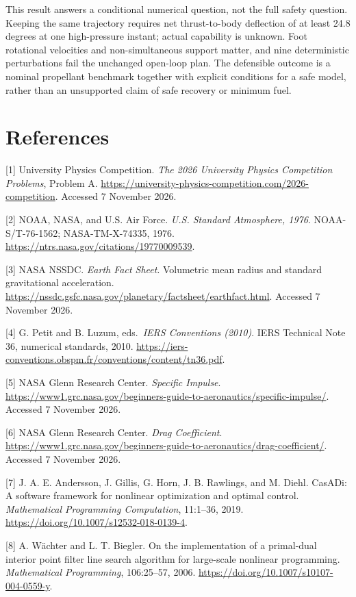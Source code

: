 \documentclass[
  11pt,
  a4paper,
]{article}
\begin{document}
This result answers a conditional numerical question, not the full
safety question. Keeping the same trajectory requires net thrust-to-body
deflection of at least 24.8 degrees at one high-pressure instant; actual
capability is unknown. Foot rotational velocities and non-simultaneous
support matter, and nine deterministic perturbations fail the unchanged
open-loop plan. The defensible outcome is a nominal propellant benchmark
together with explicit conditions for a safe model, rather than an
unsupported claim of safe recovery or minimum fuel.

\section*{References}\label{references}

{[}1{]} University Physics Competition. \emph{The 2026 University
Physics Competition Problems}, Problem A.
\url{https://university-physics-competition.com/2026-competition}.
Accessed 7 November 2026.

{[}2{]} NOAA, NASA, and U.S. Air Force. \emph{U.S. Standard Atmosphere,
1976}. NOAA-S/T-76-1562; NASA-TM-X-74335, 1976.
\url{https://ntrs.nasa.gov/citations/19770009539}.

{[}3{]} NASA NSSDC. \emph{Earth Fact Sheet}. Volumetric mean radius and
standard gravitational acceleration.
\url{https://nssdc.gsfc.nasa.gov/planetary/factsheet/earthfact.html}.
Accessed 7 November 2026.

{[}4{]} G. Petit and B. Luzum, eds.~\emph{IERS Conventions (2010)}. IERS
Technical Note 36, numerical standards, 2010.
\url{https://iers-conventions.obspm.fr/conventions/content/tn36.pdf}.

{[}5{]} NASA Glenn Research Center. \emph{Specific Impulse}.
\url{https://www1.grc.nasa.gov/beginners-guide-to-aeronautics/specific-impulse/}.
Accessed 7 November 2026.

{[}6{]} NASA Glenn Research Center. \emph{Drag Coefficient}.
\url{https://www1.grc.nasa.gov/beginners-guide-to-aeronautics/drag-coefficient/}.
Accessed 7 November 2026.

{[}7{]} J. A. E. Andersson, J. Gillis, G. Horn, J. B. Rawlings, and M.
Diehl. CasADi: A software framework for nonlinear optimization and
optimal control. \emph{Mathematical Programming Computation}, 11:1--36,
2019. \url{https://doi.org/10.1007/s12532-018-0139-4}.

{[}8{]} A. Wächter and L. T. Biegler. On the implementation of a
primal-dual interior point filter line search algorithm for large-scale
nonlinear programming. \emph{Mathematical Programming}, 106:25--57,
2006. \url{https://doi.org/10.1007/s10107-004-0559-y}.
\end{document}
